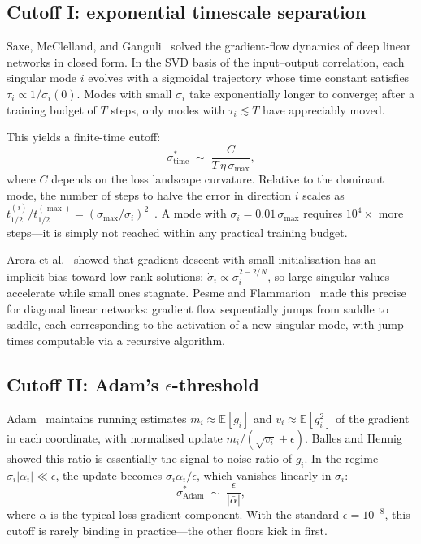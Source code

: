 \subsection{Cutoff I: exponential timescale separation}\label{app:cutoff-time}

Saxe, McClelland, and Ganguli~\cite{saxe2014exact} solved the gradient-flow dynamics of deep linear networks in closed form. In the SVD basis of the input--output correlation, each singular mode $i$ evolves with a sigmoidal trajectory whose time constant satisfies $\tau_i \propto 1/\sigma_i(0)$. Modes with small $\sigma_i$ take exponentially longer to converge; after a training budget of $T$ steps, only modes with $\tau_i \lesssim T$ have appreciably moved.

This yields a finite-time cutoff:
\begin{equation}\label{eq:sigma-time}
\sigma^*_{\mathrm{time}} \;\sim\; \frac{C}{T\,\eta\,\sigma_{\max}},
\end{equation}
where $C$ depends on the loss landscape curvature. Relative to the dominant mode, the number of steps to halve the error in direction $i$ scales as $t_{1/2}^{(i)} / t_{1/2}^{(\max)} = (\sigma_{\max}/\sigma_i)^2$~\cite{jacot2018ntk}. A mode with $\sigma_i = 0.01\,\sigma_{\max}$ requires $10^4\times$ more steps---it is simply not reached within any practical training budget.

Arora et al.~\cite{arora2019implicit} showed that gradient descent with small initialisation has an implicit bias toward low-rank solutions: $\dot{\sigma}_i \propto \sigma_i^{2-2/N}$, so large singular values accelerate while small ones stagnate. Pesme and Flammarion~\cite{pesme2023saddle} made this precise for diagonal linear networks: gradient flow sequentially jumps from saddle to saddle, each corresponding to the activation of a new singular mode, with jump times computable via a recursive algorithm.

\subsection{Cutoff II: Adam's $\epsilon$-threshold}\label{app:cutoff-adam}

Adam~\cite{kingma2015adam} maintains running estimates $m_i \approx \mathbb{E}[g_i]$ and $v_i \approx \mathbb{E}[g_i^2]$ of the gradient in each coordinate, with normalised update $m_i/(\sqrt{v_i} + \epsilon)$. Balles and Hennig~\cite{balles2018dissecting} showed this ratio is essentially the signal-to-noise ratio of $g_i$. In the regime $\sigma_i |\alpha_i| \ll \epsilon$, the update becomes $\sigma_i \alpha_i / \epsilon$, which vanishes linearly in $\sigma_i$:
\begin{equation}\label{eq:sigma-adam}
\sigma^*_{\mathrm{Adam}} \;\sim\; \frac{\epsilon}{|\bar\alpha|},
\end{equation}
where $\bar\alpha$ is the typical loss-gradient component. With the standard $\epsilon = 10^{-8}$, this cutoff is rarely binding in practice---the other floors kick in first.

